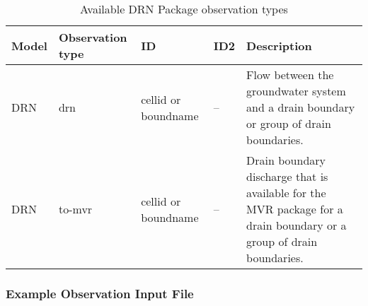 \begin{longtable}{p{2cm} p{2.75cm} p{2cm} p{1.25cm} p{7cm}}
\caption{Available DRN Package observation types} \tabularnewline

\hline
\hline
\textbf{Model} & \textbf{Observation type} & \textbf{ID} & \textbf{ID2} & \textbf{Description} \\
\hline
\endhead

\hline
\endfoot

DRN & drn & cellid or boundname & -- & Flow between the groundwater system and a drain boundary or group of drain boundaries. \\
DRN & to-mvr & cellid or boundname & -- & Drain boundary discharge that is available for the MVR package for a drain boundary or a group of drain boundaries.
\label{table:gwf-drnobstype}
\end{longtable}

\vspace{5mm}
\subsubsection{Example Observation Input File}

